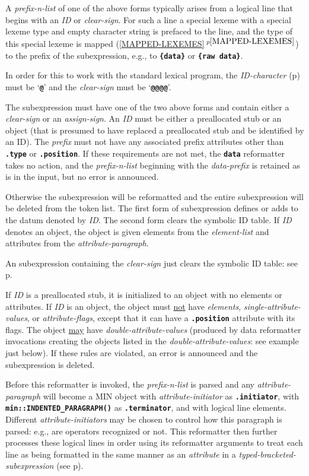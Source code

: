 \documentclass[12pt]{article}
\newcommand{\TT}[1]{{\tt \bfseries #1}}
\newcommand{\itemref}[1]{\ref{#1}$\,^{p\pageref{#1}}$}
\newcommand{\pagref}[1]{p\pageref{#1}}
\newcommand{\EOL}{\penalty \exhyphenpenalty}
\newenvironment{indpar}[1][0.3in]%
	{\begin{list}{}%
		     {\setlength{\itemsep}{0in}%
		      \setlength{\topsep}{0in}%
		      \setlength{\parsep}{1ex}%
		      \setlength{\labelwidth}{#1}%
		      \setlength{\leftmargin}{#1}%
		      \addtolength{\leftmargin}{\labelsep}}%
	 \item}%
	{\end{list}}
\begin{document}
\begin{indpar}
\begin{indpar}[0.5em]
A {\em prefix-n-list} of one of the above forms
typically arises from a logical line
that begins with an {\em ID} or {\em clear-sign}.
For such a line a special lexeme with a special
lexeme type and empty character string is prefaced
to the line, and the type of this special lexeme
is mapped (\itemref{MAPPED-LEXEMES}) to the prefix of the
subexpression, e.g., to \TT{\{data\}} or \TT{\{raw data\}}.

In order for this to work with the standard lexical program,
the {\em ID-character} (\pagref{ID-CHARACTER})
must be `\TT{@}' and the {\em clear-sign} must be `\TT{@@@@}'.

The subexpression must have one of the two above forms and
contain either a {\em clear-sign} or an {\em assign-sign}.
An {\em ID} must be either
a preallocated stub or an object (that is presumed to have replaced
a preallocated stub and be identified by an ID).
The {\em prefix} must not have any associated prefix attributes other than
\TT{.type} or \TT{.position}.  If these requirements are not met, the
\TT{data} reformatter takes no action, and the {\em prefix-n-list}
beginning with the {\em data-prefix}
is retained as is in the input, but no error is announced.

Otherwise the subexpression will be reformatted and
the entire subexpression will be deleted from the token list.
The first form of subexpression defines or adds to the datum
denoted by {\em ID}.  The second form clears the symbolic ID table.
If {\em ID} denotes
an object, the object is given
elements from the {\em element-list} and attributes from the
{\em attribute-paragraph}.

An subexpression containing the {\em clear-sign} just clears the symbolic
ID table: see \pagref{CLEAR-SYMBOLIC-TABLE}.

If {\em ID} is a preallocated stub, it is initialized to
an object with no elements or attributes.  If {\em ID}
is an object, the object must \underline{not} have
{\em elements}, {\em single-attribute-values}, or
{\em attribute-flags}, except that it can have a
\TT{.position} attribute with its flags.  The object \underline{may} have
{\em double-attribute-values} (produced by data reformatter
invocations creating the objects listed in the
{\em double-attribute-values}: see example just below).
If these rules are violated, an error is announced and the
subexpression is deleted.

Before this reformatter is invoked, the {\em prefix-n-list} is parsed
and any {\em attribute-paragraph} will become a MIN object with
{\em attribute-initiator} as \TT{.ini\-tiator}, with
\TT{min::\EOL IN\-DENT\-ED\_\EOL PARAGRAPH()} as \TT{.ter\-min\-ator},
and with logical line elements.  Different
{\em attribute-initiators} may be chosen to control how this
paragraph is parsed: e.g., are operators recognized or not.
This reformatter
then further processes these logical lines in order
using its reformatter arguments to treat each line as being
formatted in the same manner as an {\em attribute}
in a {\em typed-bracketed-subexpression}
(see \pagref{TYPED-BRACKETED-SUBEXPRESSION}).


\end{indpar}
\end{indpar}
\end{document}
